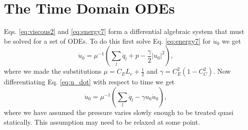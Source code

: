 \documentclass[superscriptaddress, onecolumn, prl]{revtex4}
\begin{document}
\section{The Time Domain ODEs}
Eqs. \ref{eq:viscous2} and \ref{eq:energy7} form a differential algebraic system that must be solved for a set of ODEs. To do this first solve Eq. \ref{eq:energy7} for $\dot{u}_0$ we get
\begin{equation}
\label{eq:u_dot}
\dot{u}_0 = \mu^{-1} \left(\sum_l{\dot{q}_l} + p -\frac{\gamma}{2} |u_{0}|^2  \right), 
\end{equation}
where we made the substitutions $\mu=C_E L_e + \frac{1}{2}$ and $\gamma = C_E^2 (1 - C_C^2)$. Now differentiating Eq. \ref{eq:u_dot} with respect to time we get 
\begin{equation}
\label{eq:u_ddot}
\ddot{u}_0 = \mu^{-1} \left( \sum_l{\ddot{q}_l} - \gamma u_{0} \dot{u}_0  \right),
\end{equation} 
where we have assumed the pressure varies slowly enough to be treated quasi statically. This assumption may need to be relaxed at some point.
\end{document}
